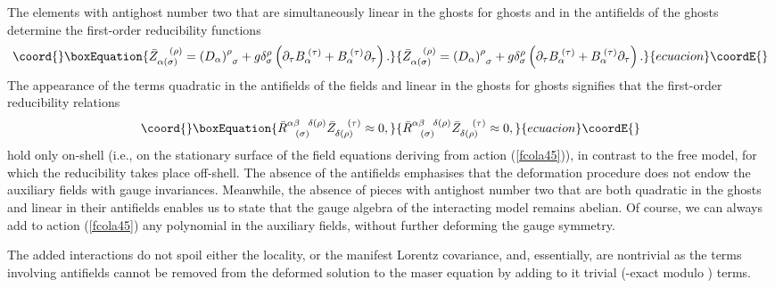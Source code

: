 \documentclass[a4paper,12pt]{article}
\begin{document}
The elements with antighost number two that are simultaneously linear in the
ghosts for ghosts and in the antifields of the ghosts determine the
first-order reducibility functions 
\begin{equation}\coord{}\boxEquation{
\bar{Z}_{\alpha (\sigma )}^{\;\;\;\;(\rho )}=\left( D_{\alpha }\right)
_{\;\;\sigma }^{\rho }+g\delta _{\sigma }^{\rho }\left( \partial _{\tau
}B_{\alpha }^{\;(\tau )}+B_{\alpha }^{\;(\tau )}\partial _{\tau }\right) .
\label{fcola47}
}{
\bar{Z}_{\alpha (\sigma )}^{\;\;\;\;(\rho )}=\left( D_{\alpha }\right)
_{\;\;\sigma }^{\rho }+g\delta _{\sigma }^{\rho }\left( \partial _{\tau
}B_{\alpha }^{\;(\tau )}+B_{\alpha }^{\;(\tau )}\partial _{\tau }\right) .
}{ecuacion}\coordE{}\end{equation}
The appearance of the terms quadratic in the antifields of the fields \coordHE{} and linear in the ghosts for ghosts
signifies that the first-order reducibility relations 
\begin{equation}\coord{}\boxEquation{
\bar{R}_{\;\;\;(\sigma )}^{\alpha \beta \;\;\;\delta (\rho )}\bar{Z}_{\delta
(\rho )}^{\;\;\;\;(\tau )}\approx 0,  \label{fcola48}
}{
\bar{R}_{\;\;\;(\sigma )}^{\alpha \beta \;\;\;\delta (\rho )}\bar{Z}_{\delta
(\rho )}^{\;\;\;\;(\tau )}\approx 0,  }{ecuacion}\coordE{}\end{equation}
hold only on-shell (i.e., on the stationary surface of the field equations
deriving from action (\ref{fcola45})), in contrast to the free model, for
which the reducibility takes place off-shell. The absence of the antifields \coordHE{} emphasises that the deformation procedure
does not endow the auxiliary fields with gauge invariances. Meanwhile, the
absence of pieces with antighost number two that are both quadratic in the
ghosts \myHighlight{$\eta _{\delta (\rho )}$}\coordHE{} and linear in their antifields enables us to
state that the gauge algebra of the interacting model remains abelian. Of
course, we can always add to action (\ref{fcola45}) any polynomial in the
auxiliary fields, without further deforming the gauge symmetry.

The added interactions do not spoil either the locality, or the manifest
Lorentz covariance, and, essentially, are nontrivial as the terms involving
antifields cannot be removed from the deformed solution to the maser
equation by adding to it trivial (\coordHE{}-exact modulo \coordHE{}) terms.
\end{document}
